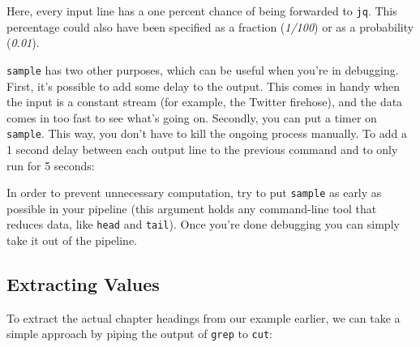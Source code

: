 \documentclass[
]{book}
\newenvironment{Shaded}{\begin{snugshade}}{\end{snugshade}}
\newcommand{\ExtensionTok}[1]{#1}
\newcommand{\FunctionTok}[1]{\textcolor[rgb]{0.00,0.00,0.00}{#1}}
\newcommand{\KeywordTok}[1]{\textcolor[rgb]{0.13,0.29,0.53}{\textbf{#1}}}
\newcommand{\NormalTok}[1]{#1}
\newcommand{\StringTok}[1]{\textcolor[rgb]{0.31,0.60,0.02}{#1}}
\theoremstyle{definition}
\theoremstyle{definition}
\theoremstyle{definition}
\theoremstyle{remark}
\begin{document}
Here, every input line has a one percent chance of being forwarded to \texttt{jq}. This percentage could also have been specified as a fraction (\emph{1/100}) or as a probability (\emph{0.01}).

\texttt{sample} has two other purposes, which can be useful when you're in debugging. First, it's possible to add some delay to the output. This comes in handy when the input is a constant stream (for example, the Twitter firehose), and the data comes in too fast to see what's going on. Secondly, you can put a timer on \texttt{sample}. This way, you don't have to kill the ongoing process manually. To add a 1 second delay between each output line to the previous command and to only run for 5 seconds:

\begin{Shaded}
\end{Shaded}

In order to prevent unnecessary computation, try to put \texttt{sample} as early as possible in your pipeline (this argument holds any command-line tool that reduces data, like \texttt{head} and \texttt{tail}). Once you're done debugging you can simply take it out of the pipeline.

\hypertarget{extracting-values}{%
\subsection{Extracting Values}\label{extracting-values}}

To extract the actual chapter headings from our example earlier, we can take a simple approach by piping the output of \texttt{grep} to \texttt{cut}:

\begin{Shaded}
\end{Shaded}
\end{document}
